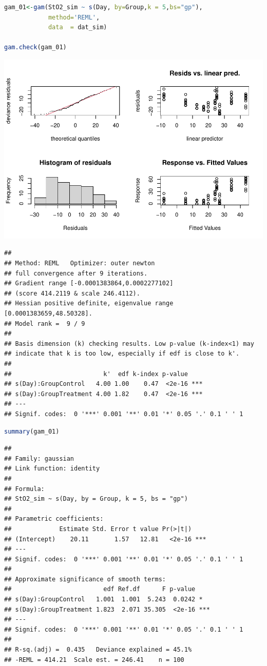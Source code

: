 \documentclass[
]{article}
\begin{document}
\begin{lstlisting}[language=R]
gam_01<-gam(StO2_sim ~ s(Day, by=Group,k = 5,bs="gp"),
            method='REML',
            data  = dat_sim)

gam.check(gam_01)
\end{lstlisting}

\includegraphics{Full_document_files/figure-latex/second-GAM-1}

\begin{lstlisting}
## 
## Method: REML   Optimizer: outer newton
## full convergence after 9 iterations.
## Gradient range [-0.0001383864,0.0002277102]
## (score 414.2119 & scale 246.4112).
## Hessian positive definite, eigenvalue range [0.0001383659,48.50328].
## Model rank =  9 / 9 
## 
## Basis dimension (k) checking results. Low p-value (k-index<1) may
## indicate that k is too low, especially if edf is close to k'.
## 
##                         k'  edf k-index p-value    
## s(Day):GroupControl   4.00 1.00    0.47  <2e-16 ***
## s(Day):GroupTreatment 4.00 1.82    0.47  <2e-16 ***
## ---
## Signif. codes:  0 '***' 0.001 '**' 0.01 '*' 0.05 '.' 0.1 ' ' 1
\end{lstlisting}

\begin{lstlisting}[language=R]
summary(gam_01)
\end{lstlisting}

\begin{lstlisting}
## 
## Family: gaussian 
## Link function: identity 
## 
## Formula:
## StO2_sim ~ s(Day, by = Group, k = 5, bs = "gp")
## 
## Parametric coefficients:
##             Estimate Std. Error t value Pr(>|t|)    
## (Intercept)    20.11       1.57   12.81   <2e-16 ***
## ---
## Signif. codes:  0 '***' 0.001 '**' 0.01 '*' 0.05 '.' 0.1 ' ' 1
## 
## Approximate significance of smooth terms:
##                         edf Ref.df      F p-value    
## s(Day):GroupControl   1.001  1.001  5.243  0.0242 *  
## s(Day):GroupTreatment 1.823  2.071 35.305  <2e-16 ***
## ---
## Signif. codes:  0 '***' 0.001 '**' 0.01 '*' 0.05 '.' 0.1 ' ' 1
## 
## R-sq.(adj) =  0.435   Deviance explained = 45.1%
## -REML = 414.21  Scale est. = 246.41    n = 100
\end{lstlisting}
\end{document}
